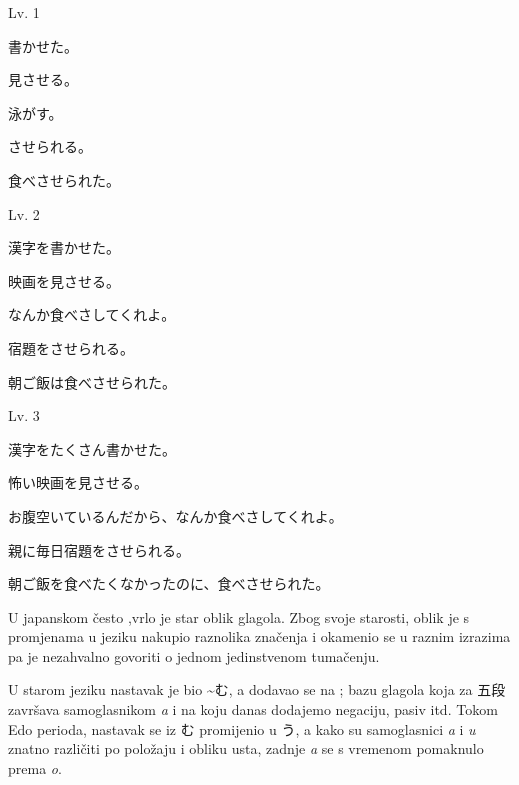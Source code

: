	\newpage		
		
	\begin{mondai}{Lv. 1}
		\item 書かせた。
		\item 見させる。
		\item 泳がす。
		\item させられる。
		\item 食べさせられた。
	\end{mondai}
		
	\begin{mondai}{Lv. 2}
		\item 漢字を書かせた。
		\item 映画を見させる。
		\item なんか食べさしてくれよ。\footnotemark[1]
		\item 宿題をさせられる。
		\item 朝ご飯は食べさせられた。
	\end{mondai}
	
	\begin{mondai}{Lv. 3}
		\item 漢字をたくさん書かせた。
		\item 怖い映画を見させる。
		\item お腹空いているんだから、なんか食べさしてくれよ。
		\item 親に毎日宿題をさせられる。
		\item 朝ご飯を食べたくなかったのに、食べさせられた。
	\end{mondai}

	
\newpage
{}

	
	U japanskom često ,\footnotemark[1] vrlo je star oblik glagola.
	Zbog svoje starosti, oblik je s promjenama u jeziku nakupio raznolika značenja i okamenio se u raznim izrazima pa je nezahvalno govoriti o jednom jedinstvenom tumačenju.
	
	
	
	U starom jeziku nastavak je bio \textasciitilde む, a dodavao se na ; bazu glagola koja za 五段 završava samoglasnikom \textit{a} i na koju danas dodajemo negaciju, pasiv itd. Tokom Edo perioda, nastavak se iz む promijenio u う, a kako su samoglasnici \textit{a} i \textit{u} znatno različiti po položaju i obliku usta, zadnje \textit{a} se s vremenom pomaknulo prema \textit{o}.
	
